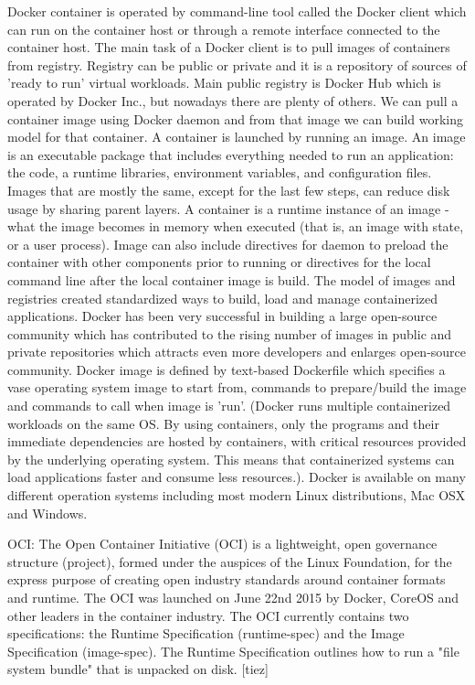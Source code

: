 Docker container is operated by command-line tool called the Docker client which can run on the container host or through a remote interface connected to the container host. The main task of a Docker client is to pull images of containers from registry. Registry can be public or private and it is a repository of sources of 'ready to run' virtual workloads. Main public registry is Docker Hub which is operated by Docker Inc., but nowadays there are plenty of others. We can pull a container image using Docker daemon and from that image we can build working model for that container. A container is launched by running an image. An image is an executable package that includes everything needed to run an application: the code, a runtime libraries, environment variables, and configuration files. Images that are mostly the same, except for the last few steps, can reduce disk usage by sharing parent layers. A container is a runtime instance of an image - what the image becomes in memory when executed (that is, an image with state, or a user process). Image can also include directives for daemon to preload the container with other components prior to running or directives for the local command line after the local container image is build. The model of images and registries created standardized ways to build, load and manage containerized applications. Docker has been very successful in building a large open-source community which has contributed to the rising number of images in public and private repositories which attracts even more developers and enlarges open-source community. Docker image is defined by text-based Dockerfile which specifies a vase operating system image to start from, commands to prepare/build the image and commands to call when image is 'run'. (Docker runs multiple containerized workloads on the same OS. By using containers, only the programs and their immediate dependencies are hosted by containers, with critical resources provided by the underlying operating system.  This means that containerized systems can load applications faster and consume less resources.). Docker is available on many different operation systems including most modern Linux distributions, Mac OSX and Windows.

OCI: The Open Container Initiative (OCI) \cite{oci} is a lightweight, open governance structure (project), formed under the auspices of the Linux Foundation, for the express purpose of creating open industry standards around container formats and runtime. The OCI was launched on June 22nd 2015 by Docker, CoreOS and other leaders in the container industry. The OCI currently contains two specifications: the Runtime Specification (runtime-spec) and the Image Specification (image-spec). The Runtime Specification outlines how to run a "file system bundle" that is unpacked on disk. [tiez]

